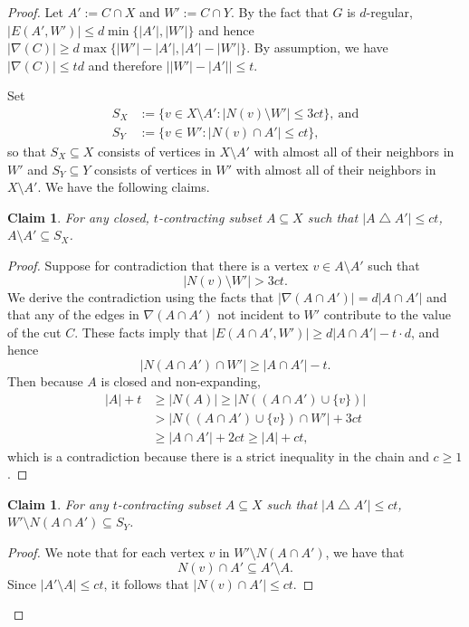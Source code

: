 \documentclass[11pt,letterpaper]{amsart}
\newtheorem{claim}[theorem]{Claim}
\theoremstyle{definition}
\newcommand{\oldqed}{}
\def\endofFact{\hfill\scalebox{.6}{$\blacksquare$}}
\newenvironment{claimproof}[1][Proof]{
  \renewcommand{\oldqed}{\qedsymbol}
  \renewcommand{\qedsymbol}{\endofFact}
  \begin{proof}[#1]
}{
  \end{proof}
  \renewcommand{\qedsymbol}{\oldqed}
}
\renewcommand{\subset}{\subseteq}
\let\oldtriangle\triangle
\def\triangle{\mathbin{\oldtriangle}}
\begin{document}
\begin{proof}
Let $A' := C \cap X$ and $W' := C \cap Y$. 
By the fact that $G$ is $d$-regular, $|E(A',W')|\le d\min\{|A'|,|W'|\}$ and hence $|\nabla(C)|\ge d \max\bigl\{|W'|-|A'|,|A'|-|W'|\bigr\}$. 
By assumption, we have $|\nabla(C)| \leq td$ and therefore $\bigl||W'| - |A'|\bigr|\leq t$.

Set
\begin{align*}
S_X & := \bigl\{v \in X \setminus A' : |N(v)\setminus W'| \le 3ct\bigr\},~\text{and} \\
S_Y &:= \bigl\{v \in  W' : |N(v)\cap A'| \le ct\bigr\},
\end{align*}
so that $S_X\subset X$ consists of vertices in $X\setminus A'$ with almost all of their neighbors in $W'$ and $S_Y\subset Y$ consists of vertices in $W'$ with almost all of their neighbors in $X\setminus A'$.
We have the following claims.
\begin{claim}\label{claim:dense_inSX} For any closed, $t$-contracting subset $A\subset X$ such that $|A \triangle A'| \leq ct$, $A \setminus A' \subseteq S_X$.
\end{claim}
\begin{claimproof}
Suppose for contradiction that there is a vertex $v \in A \setminus A'$ such that 
\[ |N(v)\setminus W'|>3ct. \]
We derive the contradiction using the facts that $|\nabla(A\cap A')|=d|A\cap A'|$ and that any of the edges in $\nabla(A\cap A')$ not incident to $W'$ contribute to the value of the cut $C$. These facts imply that $|E(A\cap A',W')|\ge d|A\cap A'|-t\cdot d$, and hence
\[ |N(A\cap A')\cap W'|\ge |A\cap A'|-t. \]
Then because $A$ is closed and non-expanding,
\begin{align*}
|A|+t &\ge |N(A)| \ge |N((A\cap A')\cup\{v\})| \\&> |N((A\cap A')\cup\{v\})\cap W'| + 3ct \\&\ge |A\cap A'| + 2ct\ge |A| + ct,
\end{align*}
 which is a contradiction because there is a strict inequality in the chain and $c\geq 1$.
\end{claimproof}


\begin{claim}\label{claim:dense_inSY} For any $t$-contracting subset $A\subset X$ such that $|A \triangle A'| \leq ct$, $W' \setminus  N(A \cap A')\subseteq S_Y$.
\end{claim}
\begin{claimproof}
We note that for each vertex $v$ in $W' \setminus N(A \cap A')$, we have that 
\[
N(v) \cap A' \subseteq A' \setminus A.
\]
Since $|A' \setminus A| \leq ct$, it follows that $|N(v)\cap A'|\leq ct $.
\end{claimproof}


\end{proof}
\end{document}

